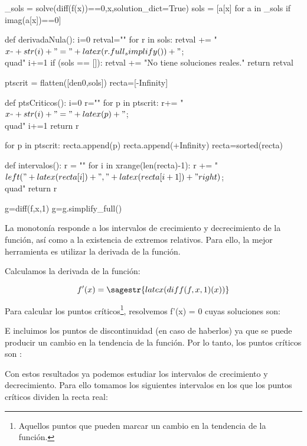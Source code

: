 \begin{sagesilent}

_sols = solve(diff(f(x))==0,x,solution_dict=True)
sols = [a[x] for a in _sols if imag(a[x])==0]

def derivadaNula():
    i=0
    retval=""
    for r in sols:
        retval += "$x_"+str(i)+" = "+latex(r.full_simplify())+"$;\\quad"
        i+=1
    if (sols == []):
        retval += "No tiene soluciones reales."
    return retval

ptscrit = flatten([den0,sols])
recta=[-Infinity]

def ptsCriticos():
    i=0
    r=""
    for p in ptscrit:
        r+= "$x_"+str(i)+"="+latex(p)+"$;\\quad"
        i+=1
    return r

for p in ptscrit:
     recta.append(p)
recta.append(+Infinity)
recta=sorted(recta)

def intervalos():
    r = ""
    for i in xrange(len(recta)-1):
        r += "$\\left("+latex(recta[i])+","+latex(recta[i+1])+"\\right)$;\\quad"  
    return r

g=diff(f,x,1)
g=g.simplify_full()
\end{sagesilent}

La monotonía responde a los intervalos de crecimiento y decrecimiento de la función, así como a la existencia de extremos relativos.
%
Para ello, la mejor herramienta es utilizar la derivada de la función.

Calculamos la derivada de la función:

\[f'(x) = \sagestr{latex(diff(f,x,1)(x))} \]%

Para calcular los puntos críticos\footnote{Aquellos puntos que pueden marcar un cambio en la tendencia de la función.}, resolvemos f'(x) = 0 cuyas soluciones son: 

E incluimos los puntos de discontinuidad (en caso de haberlos) ya que se puede producir un cambio en la tendencia de la función. 
%
Por lo tanto, los puntos críticos son : 


Con estos resultados ya podemos estudiar los intervalos de crecimiento y decrecimiento. 
%
Para ello tomamos los siguientes intervalos en los que los puntos críticos dividen la recta real:


